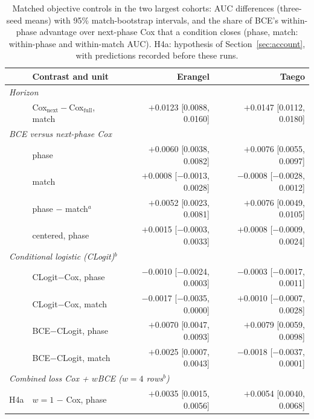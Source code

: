 \begin{table}[t]
\centering\footnotesize
\caption{Matched objective controls in the two largest cohorts: AUC differences (three-seed means) with 95\% match-bootstrap intervals, and the share of BCE's within-phase advantage over next-phase Cox that a condition closes (phase, match: within-phase and within-match AUC). H4a: hypothesis of Section~\ref{sec:account}, with predictions recorded before these runs.}
\label{tab:objective}
\setlength{\tabcolsep}{1.6pt}
\begin{tabular}{@{}llrr@{}}
\toprule
 & Contrast and unit & Erangel & Taego \\
\midrule
\multicolumn{4}{l}{\emph{Horizon}} \\
 & Cox$_{\mathrm{next}}-$Cox$_{\mathrm{full}}$, match & $+$0.0123 {\scriptsize[0.0088, 0.0160]} & $+$0.0147 {\scriptsize[0.0112, 0.0180]} \\
\multicolumn{4}{l}{\emph{BCE versus next-phase Cox}} \\
 & phase & $+$0.0060 {\scriptsize[0.0038, 0.0082]} & $+$0.0076 {\scriptsize[0.0055, 0.0097]} \\
 & match & $+$0.0008 {\scriptsize[$-$0.0013, 0.0028]} & $-$0.0008 {\scriptsize[$-$0.0028, 0.0012]} \\
 & phase $-$ match$^{a}$ & $+$0.0052 {\scriptsize[0.0023, 0.0081]} & $+$0.0076 {\scriptsize[0.0049, 0.0105]} \\
 & centered, phase & $+$0.0015 {\scriptsize[$-$0.0003, 0.0033]} & $+$0.0008 {\scriptsize[$-$0.0009, 0.0024]} \\
\multicolumn{4}{l}{\emph{Conditional logistic (CLogit)$^{b}$}} \\
 & CLogit$-$Cox, phase & $-$0.0010 {\scriptsize[$-$0.0024, 0.0003]} & $-$0.0003 {\scriptsize[$-$0.0017, 0.0011]} \\
 & CLogit$-$Cox, match & $-$0.0017 {\scriptsize[$-$0.0035, 0.0000]} & $+$0.0010 {\scriptsize[$-$0.0007, 0.0028]} \\
 & BCE$-$CLogit, phase & $+$0.0070 {\scriptsize[0.0047, 0.0093]} & $+$0.0079 {\scriptsize[0.0059, 0.0098]} \\
 & BCE$-$CLogit, match & $+$0.0025 {\scriptsize[0.0007, 0.0043]} & $-$0.0018 {\scriptsize[$-$0.0037, 0.0001]} \\
\multicolumn{4}{l}{\emph{Combined loss Cox + $w$BCE ($w{=}4$ rows$^{b}$)}} \\
H4a & $w{=}1$ $-$ Cox, phase & $+$0.0035 {\scriptsize[0.0015, 0.0056]} & $+$0.0054 {\scriptsize[0.0040, 0.0068]} \\

\end{tabular}
\end{table}
